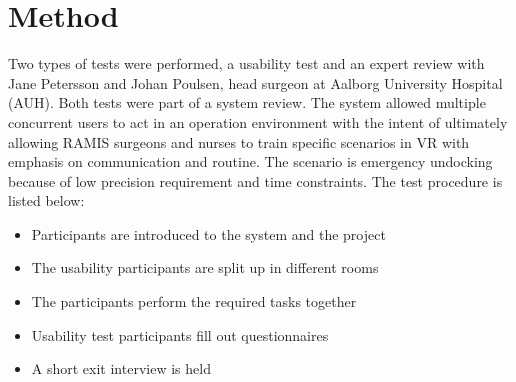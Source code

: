 \documentclass[conference]{IEEEtran}
\begin{document}
%

\section{Method}
Two types of tests were performed, a usability test and an expert review with Jane Petersson and Johan Poulsen, head surgeon at Aalborg University Hospital (AUH). Both tests were part of a system review. The system allowed multiple concurrent users to act in an operation environment with the intent of ultimately allowing RAMIS surgeons and nurses to train specific scenarios in VR with emphasis on communication and routine. The scenario is emergency undocking because of low precision requirement and time constraints. The test procedure is listed below:

\begin{itemize}
\item Participants are introduced to the system and the project
\item The usability participants are split up in different rooms
\item The participants perform the required tasks together
\item Usability test participants fill out questionnaires
\item A short exit interview is held
\end{itemize}
\end{document}
